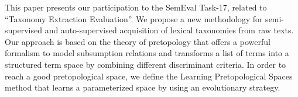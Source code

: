 This paper presents our participation to the SemEval Task-17, related to ``Taxonomy Extraction Evaluation''. We propose a new methodology for semi-supervised and auto-supervised acquisition of lexical taxonomies from raw texts. Our approach is based on the theory of pretopology that offers a powerful formalism to model subsumption relations and transforms a list of terms into a structured term space by combining different discriminant criteria. In order to reach a good pretopological space, we define the Learning Pretopological Spaces method that learns a parameterized space by using an evolutionary strategy.
